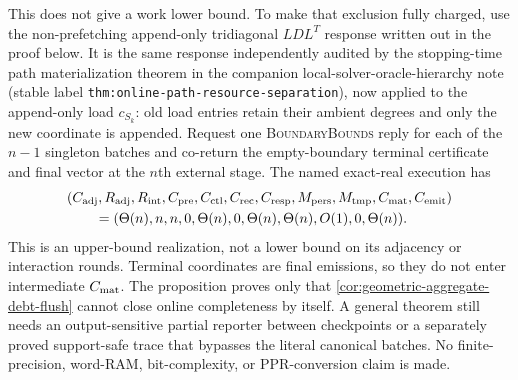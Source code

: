 \begin{proposition}
This does not give a work lower bound.  To make that exclusion fully charged,
use the non-prefetching append-only tridiagonal $LDL^T$ response written out
in the proof below.  It is the same response independently audited by the
stopping-time path materialization theorem in the companion
local-solver-oracle-hierarchy note (stable label
\texttt{thm:online-path-}\allowbreak\texttt{resource-separation}), now applied
to the append-only load $c_{S_k}$: old load entries retain their ambient
degrees and only the new coordinate is appended.  Request one
\textsc{BoundaryBounds} reply for each of the $n-1$ singleton batches and
co-return the empty-boundary terminal certificate and final vector at the
$n$th external stage.  The named exact-real execution has
\begin{equation}
 \begin{aligned}
 &(C_{\rm adj},R_{\rm adj},R_{\rm int},C_{\rm pre},C_{\rm ctl},C_{\rm rec},
 C_{\rm resp},M_{\rm pers},M_{\rm tmp},C_{\rm mat},C_{\rm emit})\\
 &\qquad=(\Theta(n),n,n,0,\Theta(n),0,\Theta(n),
           \Theta(n),O(1),0,\Theta(n)).
 \end{aligned}
 \label{eq:singleton-path-sleep-eleven-vector}
\end{equation}
This is an upper-bound realization, not a lower bound on its adjacency or
interaction rounds.  Terminal coordinates are final emissions, so they do
not enter intermediate $C_{\rm mat}$.  The proposition proves only that
\cref{cor:geometric-aggregate-debt-flush} cannot close online completeness by
itself.  A general theorem still needs an output-sensitive partial reporter
between checkpoints or a separately proved support-safe trace that bypasses
the literal canonical batches.  No finite-precision, word-RAM, bit-complexity,
or PPR-conversion claim is made.
\end{proposition}

